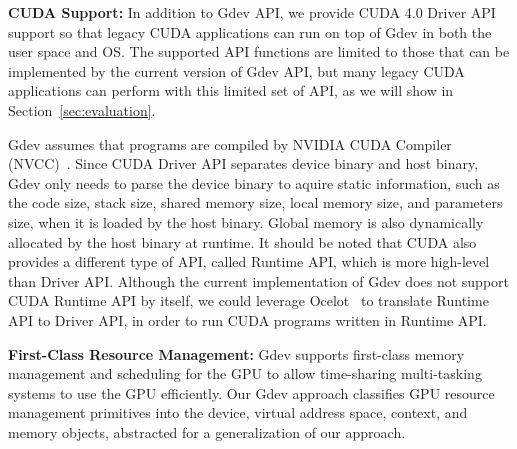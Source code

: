 \textbf{CUDA Support:}
In addition to Gdev API, we provide CUDA 4.0 Driver API~\cite{CUDA40}
support so that legacy CUDA applications can run on top of Gdev in both
the user space and OS.
The supported API functions are limited to those that can be implemented
by the current version of Gdev API, but many legacy CUDA applications
can perform with this limited set of API, as we will show in
Section~\ref{sec:evaluation}.

Gdev assumes that programs are compiled by NVIDIA CUDA Compiler
(NVCC)~\cite{CUDA40}.
Since CUDA Driver API separates device binary and host binary, Gdev only
needs to parse the device binary to aquire static information, such
as the code size, stack size, shared memory size, local memory size, and
parameters size, when it is loaded by the host binary.
Global memory is also dynamically allocated by the host binary at
runtime.
It should be noted that CUDA also provides a different type of API,
called Runtime API, which is more high-level than Driver API.
Although the current implementation of Gdev does not support CUDA
Runtime API by itself, we could leverage Ocelot~\cite{Diamos_PACT10} to
translate Runtime API to Driver API, in order to run CUDA programs
written in Runtime API.

\textbf{First-Class Resource Management:}
Gdev supports first-class memory management and scheduling for the GPU
to allow time-sharing multi-tasking systems to use the GPU
efficiently.
Our Gdev approach classifies GPU resource management primitives into
the device, virtual address space, context, and memory objects,
abstracted for a generalization of our approach.